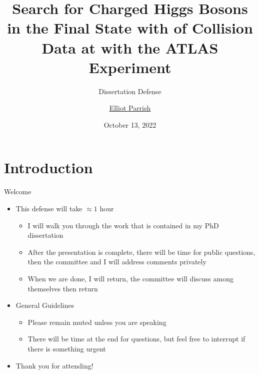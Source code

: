 \documentclass[aspectratio=169,xcolor=table]{beamer}
\title[Search for \HpmLong with ATLAS]
{Search for Charged Higgs Bosons in the \taulep Final State with \LUMI of \pp Collision Data at \sqs with the ATLAS Experiment}
\subtitle{Dissertation Defense}
\author[Elliot Parrish]
{\texorpdfstring{\underline{Elliot Parrish}}{Elliot Parrish}\inst{\dag}}
\institute[NIU] {\inst{\dag}Northern Illinois University, USA}
\date{October 13, 2022}
\begin{document}
\frame{\titlepage}




\begin{frame}{\contentsname}
  \begin{multicols}{2}
    \tableofcontents
  \end{multicols}
\end{frame}

\section{Introduction }
  
  \begin{frame}[t]{Welcome}
    \begin{itemize}
      \item This defense will take $\approx 1$ hour
      \begin{itemize}
        \item I will walk you through the work that is contained in my PhD dissertation
        \item After the presentation is complete, there will be time for public questions, then the committee and I will address comments privately
        \item When we are done, I will return, the committee will discuss among themselves then return
      \end{itemize}
      \item General Guidelines
      \begin{itemize}
        \item Please remain muted unless you are speaking
        \item There will be time at the end for questions, but feel free to interrupt if there is something urgent
      \end{itemize}
      \item Thank you for attending!
    \end{itemize}
  \end{frame}
\end{document}
